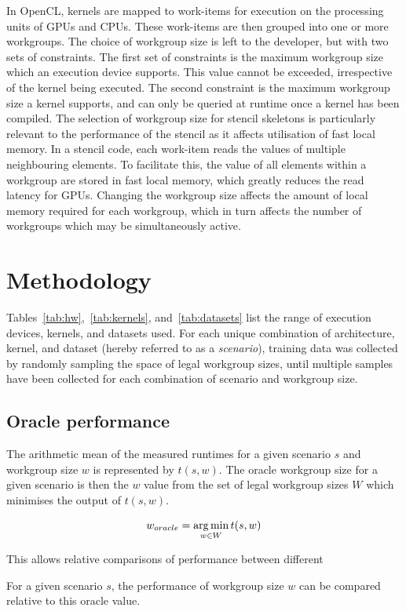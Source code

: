 In OpenCL, kernels are mapped to work-items for execution on the
processing units of GPUs and CPUs. These work-items are then grouped
into one or more workgroups. The choice of workgroup size is left to
the developer, but with two sets of constraints. The first set of
constraints is the maximum workgroup size which an execution device
supports. This value cannot be exceeded, irrespective of the kernel
being executed. The second constraint is the maximum workgroup size a
kernel supports, and can only be queried at runtime once a kernel has
been compiled. The selection of workgroup size for stencil skeletons
is particularly relevant to the performance of the stencil as it
affects utilisation of fast local memory. In a stencil code, each
work-item reads the values of multiple neighbouring elements. To
facilitate this, the value of all elements within a workgroup are
stored in fast local memory, which greatly reduces the read latency
for GPUs. Changing the workgroup size affects the amount of local
memory required for each workgroup, which in turn affects the number
of workgroups which may be simultaneously active.

\section{Methodology}

Tables~\ref{tab:hw},~\ref{tab:kernels}, and~\ref{tab:datasets} list
the range of execution devices, kernels, and datasets used. For each
unique combination of architecture, kernel, and dataset (hereby
referred to as a \emph{scenario}), training data was collected by
randomly sampling the space of legal workgroup sizes, until multiple
samples have been collected for each combination of scenario and
workgroup size.

\subsection{Oracle performance}
The arithmetic mean of the measured runtimes for a given scenario $s$
and workgroup size $w$ is represented by $t(s,w)$. The oracle
workgroup size for a given scenario is then the $w$ value from the set
of legal workgroup sizes $W$ which minimises the output of $t(s,w)$.

\[w_{oracle} = \operatorname*{arg\,min}_{w \in W} t(s,w)\]

This allows relative comparisons of performance between different

For a given scenario $s$, the performance of workgroup size $w$ can be
compared relative to this oracle value.

